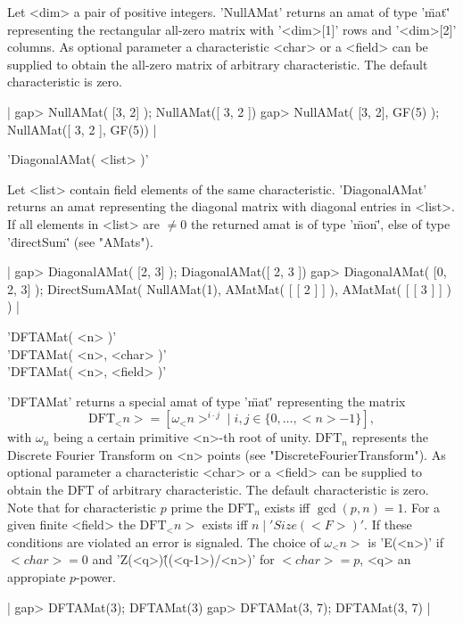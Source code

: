 Let <dim> a pair of positive integers. 'NullAMat' returns
an amat of type '\"mat\"' representing the rectangular
all-zero matrix with '<dim>[1]' rows and '<dim>[2]' columns. 
As optional parameter a characteristic <char> or a <field> 
can be supplied to obtain the all-zero matrix of arbitrary characteristic. 
The default characteristic is zero. 

|    gap> NullAMat( [3, 2] );
    NullAMat([ 3, 2 ])
    gap> NullAMat( [3, 2], GF(5) ); 
    NullAMat([ 3, 2 ], GF(5)) |


'DiagonalAMat( <list> )'

Let <list> contain field elements of the same characteristic.
'DiagonalAMat' returns an amat representing the diagonal matrix
with diagonal entries in <list>. If all elements in <list> are
$\neq 0$ the returned amat is of type '\"mon\"', else of type
'\"directSum\"' (see "AMats").

|    gap> DiagonalAMat( [2, 3] );
    DiagonalAMat([ 2, 3 ])
    gap> DiagonalAMat( [0, 2, 3] );
    DirectSumAMat(
      NullAMat(1),
      AMatMat(
        [ [ 2 ] ]
      ),
      AMatMat(
        [ [ 3 ] ]
      )
    ) |


'DFTAMat( <n> )'\\
'DFTAMat( <n>, <char> )'\\
'DFTAMat( <n>, <field> )'

'DFTAMat' returns a special amat of type '\"mat\"' representing the 
matrix 
$$
\mbox{DFT}_<n> = [\omega_<n>^{i\cdot j}\mid i,j\in\{0,\dots,<n>-1\}],
$$ 
with $\omega_n$ being a certain primitive <n>-th root of unity.
$\mbox{DFT}_n$ represents the Discrete Fourier Transform on <n> 
points (see "DiscreteFourierTransform").
As optional parameter a characteristic <char> or a <field>
can be supplied to obtain the $\mbox{DFT}$ of arbitrary characteristic. 
The default characteristic is zero. Note that for characteristic 
$p$ prime the $\mbox{DFT}_n$ exists iff $\gcd(p, n) = 1$. For a given 
finite <field> the $\mbox{DFT}_<n>$ exists iff $n\mid'Size( <F> )'$. 
If these conditions are violated an error is signaled.
The choice of $\omega_<n>$ is 'E(<n>)' if $<char> = 0$ and
'Z(<q>)\^((<q-1>)/<n>)' for $<char> = p$, <q> an appropiate $p$-power.

|    gap> DFTAMat(3);
    DFTAMat(3)
    gap> DFTAMat(3, 7);
    DFTAMat(3, 7) |

